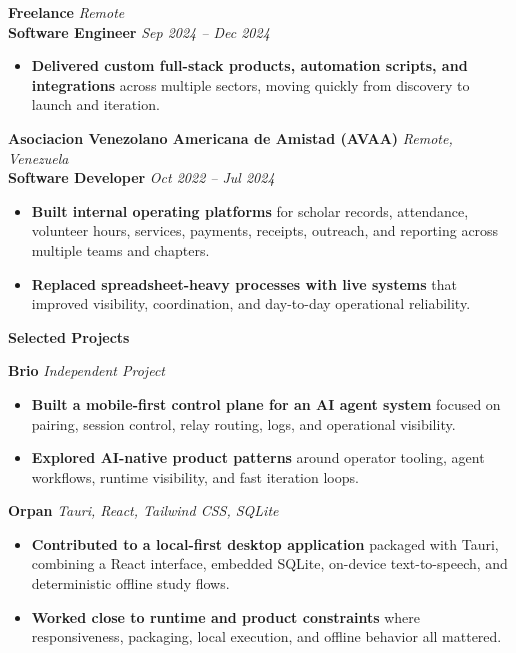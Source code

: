 \documentclass[11pt]{article}
\begin{document}
\vspace{8pt}
\textbf{Freelance} \hfill \textit{Remote} \\
\textbf{Software Engineer} \hfill \textit{Sep 2024 -- Dec 2024}
\begin{itemize}
    \item \textbf{Delivered custom full-stack products, automation scripts, and integrations} across multiple sectors, moving quickly from discovery to launch and iteration.
\end{itemize}

\vspace{8pt}
\textbf{Asociacion Venezolano Americana de Amistad (AVAA)} \hfill \textit{Remote, Venezuela} \\
\textbf{Software Developer} \hfill \textit{Oct 2022 -- Jul 2024}
\begin{itemize}
    \item \textbf{Built internal operating platforms} for scholar records, attendance, volunteer hours, services, payments, receipts, outreach, and reporting across multiple teams and chapters.
    \item \textbf{Replaced spreadsheet-heavy processes with live systems} that improved visibility, coordination, and day-to-day operational reliability.
\end{itemize}

\vspace{6pt}
\begin{center}
    \textbf{Selected Projects}
\end{center}
\vspace{-4pt}

\textbf{Brio} \hfill \textit{Independent Project}
\begin{itemize}
    \item \textbf{Built a mobile-first control plane for an AI agent system} focused on pairing, session control, relay routing, logs, and operational visibility.
    \item \textbf{Explored AI-native product patterns} around operator tooling, agent workflows, runtime visibility, and fast iteration loops.
\end{itemize}

\vspace{6pt}
\textbf{Orpan} \hfill \textit{Tauri, React, Tailwind CSS, SQLite}
\begin{itemize}
    \item \textbf{Contributed to a local-first desktop application} packaged with Tauri, combining a React interface, embedded SQLite, on-device text-to-speech, and deterministic offline study flows.
    \item \textbf{Worked close to runtime and product constraints} where responsiveness, packaging, local execution, and offline behavior all mattered.
\end{itemize}
\end{document}
